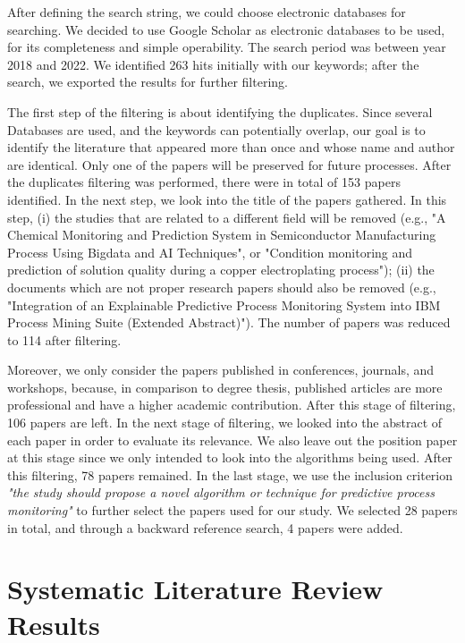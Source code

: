 \documentclass[runningheads]{llncs}
\begin{document}
		After defining the search string, we could choose electronic databases for searching. We decided to use Google Scholar as electronic databases to be used, for its completeness and simple operability. The search period was between year 2018 and 2022. We identified 263 hits initially with our keywords; after the search, we exported the results for further filtering.
		
		The first step of the filtering is about identifying the duplicates. Since several Databases are used, and the keywords can potentially overlap, our goal is to identify the literature that appeared more than once and whose name and author are identical. Only one of the papers will be preserved for future processes. After the duplicates filtering was performed, there were in total of 153 papers identified. In the next step, we look into the title of the papers gathered. In this step, (i) the studies that are related to a different field will be removed (e.g., "A Chemical Monitoring and Prediction System in Semiconductor Manufacturing Process Using Bigdata and AI Techniques", or "Condition monitoring and prediction of solution quality during a copper electroplating process"); (ii) the documents which are not proper research papers should also be removed (e.g., "Integration of an Explainable Predictive Process Monitoring System into IBM Process Mining Suite (Extended Abstract)"). The number of papers was reduced to 114 after filtering.
		
		Moreover, we only consider the papers published in conferences, journals, and workshops, because, in comparison to degree thesis, published articles are more professional and have a higher academic contribution. After this stage of filtering, 106 papers are left. In the next stage of filtering, we looked into the abstract of each paper in order to evaluate its relevance. We also leave out the position paper at this stage since we only intended to look into the algorithms being used. After this filtering, 78 papers remained. In the last stage, we use the inclusion criterion \textit{"the study should propose a novel algorithm or technique for predictive process monitoring"} to further select the papers used for our study. We selected 28 papers in total, and through a backward reference search, 4 papers were added.

		
	\section{Systematic Literature Review Results}
\end{document}
